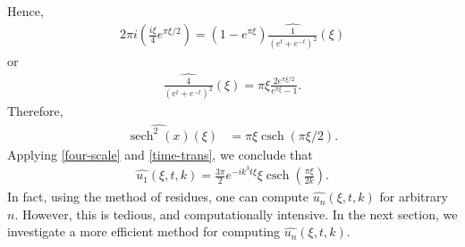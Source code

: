\documentclass[12pt,reqno]{amsart}
\numberwithin{equation}{section}  %
\newcommand{\wh}{\widehat}
\DeclareMathOperator{\sech}{sech}
\DeclareMathOperator{\csch}{csch}
\begin{document}
        Hence,  
        \begin{equation*}
        \begin{split}
          2 \pi i\left( \frac{i\xi}{4} e^{\pi \xi/2} \right) = \left (1 -
          e^{ \pi \xi} \right ) \wh{\frac{1}{(e^{t} + e^{-t})^{2}}}(\xi)
        \end{split}
        \end{equation*}
        or
        \begin{equation*}
        \begin{split}
          \wh{\frac{4}{(e^{t} + e^{-t})^{2}}}(\xi) = \pi \xi \frac{2  e^{ \pi \xi
          /2}}{e^{ \pi \xi} -1}.
        \end{split}
        \end{equation*}
        Therefore, 
        \begin{equation*}
        \begin{split}
          \wh{\sech^{2}(x)}(\xi)
          & = \pi \xi \csch( \pi \xi/2).
        \end{split}
        \end{equation*}
        Applying \eqref{four-scale} and \eqref{time-trans}, we conclude that
        \begin{equation}
          \label{kdv-sol-four}
        \begin{split}
          \wh{u_{1}}(\xi, t, k) = \frac{3 \pi }{2} e^{-ik^{3}t \xi} \xi
          \csch \left (\frac{\pi \xi}{2k} \right ).
        \end{split}
        \end{equation}
In fact, using the method of residues, one can compute $\wh{u_{n}}(\xi, t, k)$
        for arbitrary $n$. However, this is tedious, and computationally
        intensive.  In the next section, we investigate a more efficient method
        for computing $\wh{u_{n}}(\xi, t, k)$. 
\end{document}
